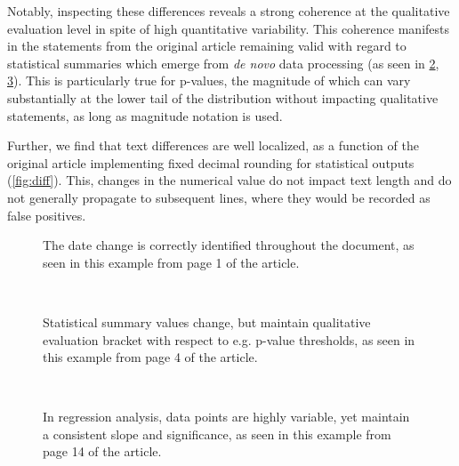 Notably, inspecting these differences reveals a strong coherence at the qualitative evaluation level in spite of high quantitative variability.
This coherence manifests in the statements from the original article remaining valid with regard to statistical summaries which emerge from  \textit{de novo} data processing (as seen in \ref{fig:diff_text}, \ref{fig:diff_fig}).
This is particularly true for p-values, the magnitude of which can vary substantially at the lower tail of the distribution without impacting qualitative statements, as long as magnitude notation is used.


Further, we find that text differences are well localized, as a function of the original article implementing fixed decimal rounding for statistical outputs (\cref{fig:diff}).
This, changes in the numerical value do not impact text length and do not generally propagate to subsequent lines, where they would be recorded as false positives.

\begin{figure*}
	\centering
	\begin{subfigure}{0.99\textwidth}
		\centering
		\caption{
			The date change is correctly identified throughout the document, as seen in this example from page 1 of the article.
		}
		\label{fig:diff_date}
	\end{subfigure}
	\\
	\begin{subfigure}{0.99\textwidth}
		\centering
		\caption{
			Statistical summary values change, but maintain qualitative evaluation bracket with respect to e.g. p-value thresholds, as seen in this example from page 4 of the article.
		}
		\label{fig:diff_text}
	\end{subfigure}
	\\
	\vspace{1em}
	\begin{subfigure}{0.99\textwidth}
		\centering
		\caption{
			In regression analysis, data points are highly variable, yet maintain a consistent slope and significance, as seen in this example from page 14 of the article.
		}
		\label{fig:diff_fig}
	\end{subfigure}
	\caption{
		\textbf{The article difference showcases expected quantitative and metadata variability, while maintaining overall validity of qualitative statements.}
		The figures are extracted from a full article \texttt{diff}, with tinted highlighting (blue for the Historical Manuscript Record, and orange for the new reexecution system result).
	}
	\label{fig:diff}
\end{figure*}

